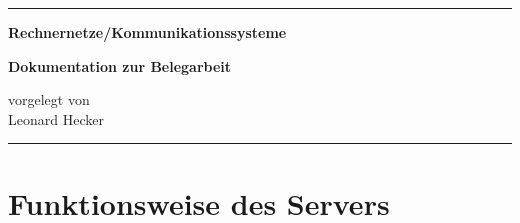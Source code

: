 


\begin{titlepage}
	\vspace*{\fill}

	\rule{\textwidth}{0.25pt}

	\vspace*{1cm}

	\begin{singlespace}
		\begin{center} \Large \bfseries
			Rechnernetze/Kommunikationssysteme
		\end{center}
	\end{singlespace}

	\vspace{2em}

	\begin{singlespace}
		\begin{center} \bfseries
			Dokumentation zur Belegarbeit
		\end{center}
	\end{singlespace}

	\vspace*{6cm}

	\begin{center}
		vorgelegt von \\
		\vspace{2em}
		Leonard Hecker
	\end{center}

	\vspace*{1cm}

	\rule{\textwidth}{0.25pt}

	\vspace*{\fill}
\end{titlepage}


\tableofcontents


\chapter{Funktionsweise des Servers}

